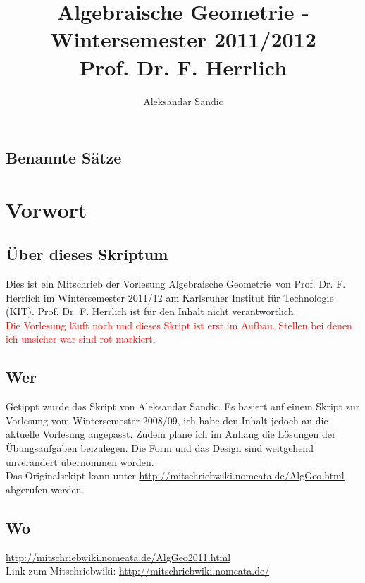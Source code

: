 \documentclass[a4paper,12pt]{report}
\title{Algebraische Geometrie - Wintersemester 2011/2012\\ Prof. Dr. F. Herrlich}
\author{Aleksandar Sandic}
\theoremstyle{break}
\theoremstyle{nonumberbreak}
\theoremstyle{nonumberplain}
\begin{document}
\maketitle

\setlength\parskip{0.6pt}
\tableofcontents

\section*{Benannte S\"atze}


\setlength\parskip{\smallskipamount}



\chapter{Vorwort}
\setcounter{secnumdepth}{2}
\section*{\"Uber dieses Skriptum}
Dies ist ein Mitschrieb der Vorlesung \glqq Algebraische Geometrie\grqq\ von Prof. Dr. F. Herrlich im
Wintersemester 2011/12 am Karlsruher Institut f\"ur Technologie (KIT). Prof. Dr. F. Herrlich ist f\"ur  den Inhalt nicht verantwortlich.\\
\textcolor{red}{Die Vorlesung l\"auft noch und dieses Skript ist erst im Aufbau. Stellen bei denen ich unsicher war sind rot markiert.}
\section*{Wer}
Getippt wurde das Skript von Aleksandar Sandic. Es basiert auf einem Skript zur Vorlesung vom Wintersemester 2008/09, ich habe den Inhalt jedoch an die aktuelle Vorlesung angepasst. Zudem plane ich im Anhang die L\"osungen der \"Ubungsaufgaben beizulegen. Die Form und das Design sind weitgehend unver\"andert \"ubernommen worden.\\
Das Originalsrkipt kann unter \url{http://mitschriebwiki.nomeata.de/AlgGeo.html} abgerufen werden.

\section*{Wo}
\url{http://mitschriebwiki.nomeata.de/AlgGeo2011.html}\\
Link zum Mitschriebwiki: \url{http://mitschriebwiki.nomeata.de/}
\end{document}
